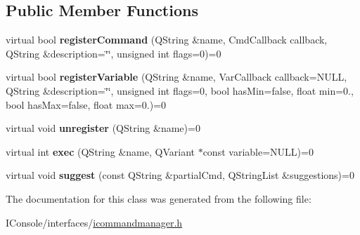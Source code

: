 \subsection*{Public Member Functions}
\begin{DoxyCompactItemize}
\item 
\hypertarget{class_i_command_manager_a04ad1ccf7336d550c9bb46d38417196c}{virtual bool {\bfseries register\-Command} (Q\-String \&name, Cmd\-Callback callback, Q\-String \&description=\char`\"{}\char`\"{}, unsigned int flags=0)=0}\label{class_i_command_manager_a04ad1ccf7336d550c9bb46d38417196c}

\item 
\hypertarget{class_i_command_manager_af2642fcd4711e203d6caadc48e147492}{virtual bool {\bfseries register\-Variable} (Q\-String \&name, Var\-Callback callback=N\-U\-L\-L, Q\-String \&description=\char`\"{}\char`\"{}, unsigned int flags=0, bool has\-Min=false, float min=0., bool has\-Max=false, float max=0.)=0}\label{class_i_command_manager_af2642fcd4711e203d6caadc48e147492}

\item 
\hypertarget{class_i_command_manager_a8ea6c917b51e564a937ded9ac40cd265}{virtual void {\bfseries unregister} (Q\-String \&name)=0}\label{class_i_command_manager_a8ea6c917b51e564a937ded9ac40cd265}

\item 
\hypertarget{class_i_command_manager_a6f32752cbd34de65d4194fabd3d4ff22}{virtual int {\bfseries exec} (Q\-String \&name, Q\-Variant $\ast$const variable=N\-U\-L\-L)=0}\label{class_i_command_manager_a6f32752cbd34de65d4194fabd3d4ff22}

\item 
\hypertarget{class_i_command_manager_a883397692f50a33c1442ad743b599b9a}{virtual void {\bfseries suggest} (const Q\-String \&partial\-Cmd, Q\-String\-List \&suggestions)=0}\label{class_i_command_manager_a883397692f50a33c1442ad743b599b9a}

\end{DoxyCompactItemize}


The documentation for this class was generated from the following file\-:\begin{DoxyCompactItemize}
\item 
I\-Console/interfaces/\hyperlink{icommandmanager_8h}{icommandmanager.\-h}\end{DoxyCompactItemize}
